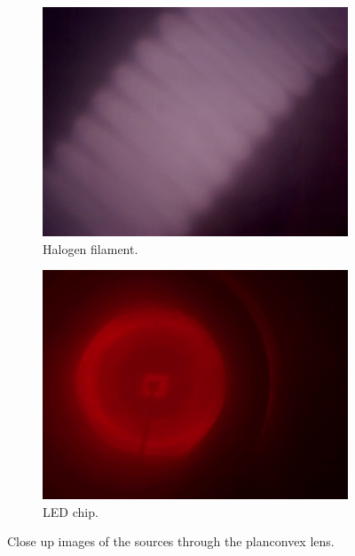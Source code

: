 \documentclass[a4paper, 12pt]{paper}
\begin{document}
\begin{figure}[h]
    \centering
    \begin{subfigure}[p]{0.40\textwidth}
        \includegraphics[width=\textwidth]{img/lens_halogen}
        \caption{Halogen filament.}
    \end{subfigure}
    \begin{subfigure}[p]{0.40\textwidth}
        \includegraphics[width=\textwidth]{img/lens_led}
        \caption{LED chip.}
    \end{subfigure}
    \caption{Close up images of the sources through the planconvex lens.}
\label{fig:planconvex}
\end{figure}
\end{document}
